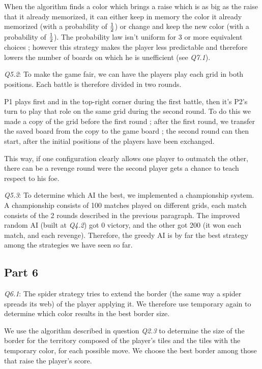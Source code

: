 \documentclass[a4paper]{article}
\begin{document}
 When the algorithm finds a color which brings a raise which is as big as the raise that it already memorized, it can either keep in memory the color it already memorized (with a probability of $1 \over 2$) or change and keep the new color (with a probability of $1 \over 2$). The probability law isn't uniform for 3 or more equivalent choices ; however this strategy makes the player less predictable
  and therefore lowers the number of boards on which he is unefficient (see \textit{Q7.1}).\newline

\emph{Q5.2}: To make the game fair, we can have the players play each grid in both positions. Each battle is therefore divided in two
rounds.

 P1 plays first and in the top-right corner during the first battle, then it's P2's turn to play that role on the same
  grid during the second round. To do this we made a copy of the grid before the first round ; after the first round, we transfer the saved board from the copy to the game board ; the second round can then start,
  after the initial positions of the players have been exchanged.
 
This way, if one configuration clearly allows one player to outmatch the other, there can be a revenge round were the second player
gets a chance to teach respect to his foe.\newline

\emph{Q5.3}: To determine which AI the best, we implemented a championship system. A championship consists of 100 matches played
 on different grids, each match consists of the 2 rounds described in the previous paragraph.
  The improved random AI (built at \textit{Q4.2}) got 0 victory, and the other got 200 (it won each match, and each revenge).
   Therefore, the greedy AI is by far the best strategy among the strategies we have seen so far.\newline

\subsection{Part 6}

\emph{Q6.1}: The spider strategy tries to extend the border (the same way a spider spreads its web) of the player applying it. We therefore use temporary again to determine which color results in the best border size.
 
 We use the algorithm described in question \textit{Q2.3} to determine the size of the border for the territory composed of the player's tiles and the tiles with the temporary color, for each possible move. 
 We choose the best border among those that raise the player's score.
 
\end{document}
